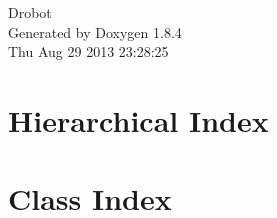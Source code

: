 \documentclass[twoside]{book}
\newcommand{\clearemptydoublepage}{%
  \newpage{\pagestyle{empty}\cleardoublepage}%
}
\begin{document}
\hypersetup{pageanchor=false}
\begin{titlepage}
\vspace*{7cm}
\begin{center}%
{\Large Drobot }\\
\vspace*{1cm}
{\large Generated by Doxygen 1.8.4}\\
\vspace*{0.5cm}
{\small Thu Aug 29 2013 23:28:25}\\
\end{center}
\end{titlepage}
\clearemptydoublepage
\tableofcontents
\clearemptydoublepage
{}
\hypersetup{pageanchor=true}

\chapter{Hierarchical Index}

\chapter{Class Index}

\end{document}
